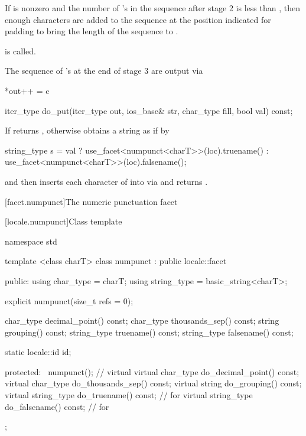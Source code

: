 \begin{itemdescr}
\begin{description}
If
is nonzero and the number of
's
in the sequence after stage 2 is less than
,
then enough  characters are added to the sequence at the position
indicated for padding to bring the length of the sequence to
.
 
is called.

The sequence of
's
at the end of stage 3 are output via

\begin{codeblock}
*out++ = c
\end{codeblock}
\end{description}
\end{itemdescr}

%
\begin{itemdecl}
iter_type do_put(iter_type out, ios_base& str, char_type fill,
                 bool val) const;
\end{itemdecl}

\begin{itemdescr}
\pnum
\returns
If
returns
,
otherwise obtains a string
as if by
\begin{codeblock}
string_type s =
  val ? use_facet<numpunct<charT>>(loc).truename()
    : use_facet<numpunct<charT>>(loc).falsename();
\end{codeblock}
and then inserts each character
of
into
via
and returns
.
\end{itemdescr}

[facet.numpunct]{The numeric punctuation facet}

[locale.numpunct]{Class template }

%
\begin{codeblock}
namespace std {
  template <class charT>
  class numpunct : public locale::facet {
  public:
    using char_type   = charT;
    using string_type = basic_string<charT>;

    explicit numpunct(size_t refs = 0);

    char_type    decimal_point()   const;
    char_type    thousands_sep()   const;
    string       grouping()        const;
    string_type  truename()        const;
    string_type  falsename()       const;

    static locale::id id;

  protected:
   ~numpunct();                 // virtual
    virtual char_type    do_decimal_point() const;
    virtual char_type    do_thousands_sep() const;
    virtual string       do_grouping()      const;
    virtual string_type  do_truename()      const;      // for 
    virtual string_type  do_falsename()     const;      // for 
  };
}
\end{codeblock}

